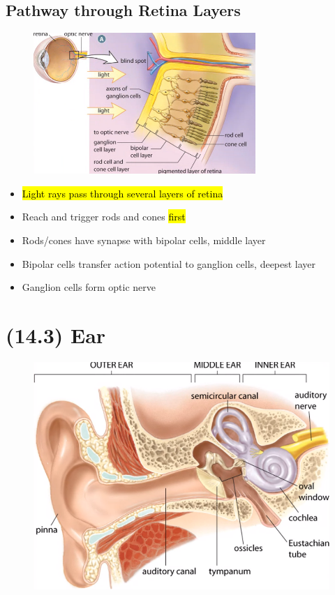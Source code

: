 \documentclass[a4paper,12pt]{article}
\begin{document}
\subsection{Pathway through Retina Layers}
\begin{figure}[H]
    \centering
    \includegraphics[width=0.75\textwidth]{retina-pathway}
\end{figure}
\begin{itemize}
    \item{\hl{Light rays pass through several layers of retina}}
    \item{Reach and trigger rods and cones \hl{first}}
    \item{Rods/cones have synapse with bipolar cells, middle layer}
    \item{Bipolar cells transfer action potential to ganglion cells, deepest layer}
    \item{Ganglion cells form optic nerve}
\end{itemize}

\pagebreak

\section{(14.3) Ear}
\begin{figure}[H]
    \centering
    \includegraphics[width=\textwidth]{ear}
\end{figure}
\end{document}
